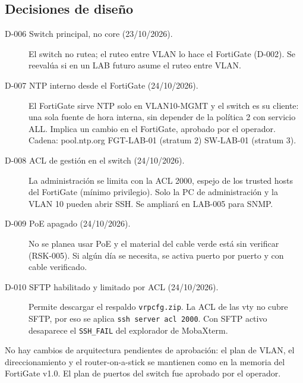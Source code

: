 \documentclass[11pt,a4paper]{article}
\begin{document}
\subsection{Decisiones de diseño}
\begin{description}
  \item[D-006 Switch principal, no core (23/10/2026).] El switch no rutea; el ruteo entre VLAN lo hace el FortiGate (D-002). Se reevalúa si en un LAB futuro asume el ruteo entre VLAN.
  \item[D-007 NTP interno desde el FortiGate (24/10/2026).] El FortiGate sirve NTP solo en VLAN10-MGMT y el switch es su cliente: una sola fuente de hora interna, sin depender de la política 2 con servicio ALL. Implica un cambio en el FortiGate, aprobado por el operador. Cadena: pool.ntp.org \textrightarrow{} FGT-LAB-01 (stratum 2) \textrightarrow{} SW-LAB-01 (stratum 3).
  \item[D-008 ACL de gestión en el switch (24/10/2026).] La administración se limita con la ACL 2000, espejo de los trusted hosts del FortiGate (mínimo privilegio). Solo la PC de administración y la VLAN 10 pueden abrir SSH. Se ampliará en LAB-005 para SNMP.
  \item[D-009 PoE apagado (24/10/2026).] No se planea usar PoE y el material del cable verde está sin verificar (RSK-005). Si algún día se necesita, se activa puerto por puerto y con cable verificado.
  \item[D-010 SFTP habilitado y limitado por ACL (24/10/2026).] Permite descargar el respaldo \texttt{vrpcfg.zip}. La ACL de las vty no cubre SFTP, por eso se aplica \texttt{ssh server acl 2000}. Con SFTP activo desaparece el \texttt{SSH\_FAIL} del explorador de MobaXterm.
\end{description}

No hay cambios de arquitectura pendientes de aprobación: el plan de VLAN, el direccionamiento y el router-on-a-stick se mantienen como en la memoria del FortiGate v1.0. El plan de puertos del switch fue aprobado por el operador.
\end{document}
